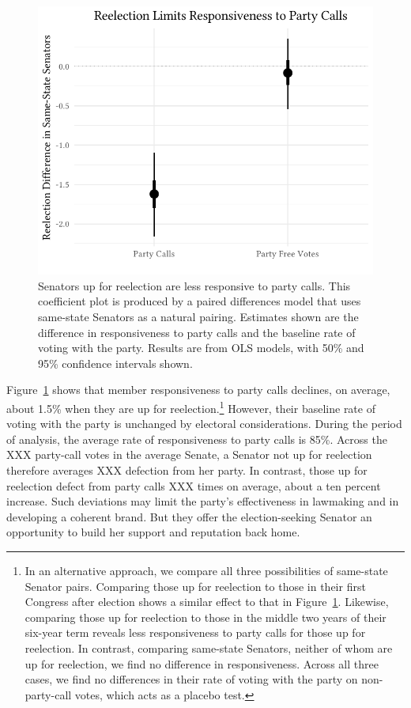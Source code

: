\documentclass[12pt]{article}
\begin{document}
\begin{figure}[!htbp]
\centering
\includegraphics[width = 12cm]{senate_difference_estimates.pdf}

\caption{Senators up for reelection are less responsive to party calls.
This coefficient plot is produced by a paired differences model that uses same-state Senators as a natural pairing. Estimates shown are the difference in responsiveness to party calls and the baseline rate of voting with the party. Results are from OLS models, with 50\% and 95\% confidence intervals shown.
\label{fig-reelection-responsiveness}}
\end{figure}

Figure~\ref{fig-reelection-responsiveness} shows that member responsiveness to party calls declines, on average, about 1.5\% when they are up for reelection.\footnote{\doublespacing\normalsize In an alternative approach, we compare all three possibilities of same-state Senator pairs.  Comparing those up for reelection to those in their first Congress after election shows a similar effect to that in Figure~\ref{fig-reelection-responsiveness}.  Likewise, comparing those up for reelection to those in the middle two years of their six-year term reveals less responsiveness to party calls for those up for reelection.  In contrast, comparing same-state Senators, neither of whom are up for reelection, we find no difference in responsiveness.  Across all three cases, we find no differences in their rate of voting with the party on non-party-call votes, which acts as a placebo test.} However, their baseline rate of voting with the party is unchanged by electoral considerations. During the period of analysis, the average rate of responsiveness to party calls is 85\%. Across the XXX party-call votes in the average Senate, a Senator not up for reelection therefore averages XXX defection from her party.  In contrast, those up for reelection defect from party calls XXX times on average, about a ten percent increase.  Such deviations may limit the party's effectiveness in lawmaking and in developing a coherent brand.  But they offer the election-seeking Senator an opportunity to build her support and reputation back home.
\end{document}
